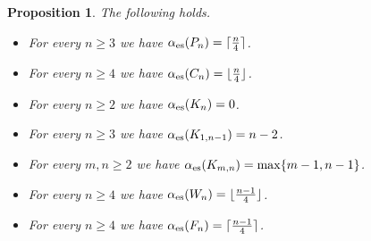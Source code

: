 \documentclass[11pt]{article}
\newtheorem{proposition}[theorem]{Proposition}
\newcommand{\es}{\alpha_{\rm es}}
\begin{document}
\begin{proposition}
\label{families}
The following holds.
\begin{itemize}%
\item[(i)] For every $n\geq 3$ we have $\es(P_n) = \lceil\frac n4\rceil$.
\item[(ii)] For every $n\geq 4$ we have $\es(C_n) = \lfloor\frac n4\rfloor$. 
\item[(iii)] For every $n\geq 2$ we have $\es(K_n) = 0$.
\item[(iv)] For every $n\geq 3$ we have $\es(K_{1,n-1}) = n-2$.
\item[(v)] For every $m,n\geq 2$ we have $\es(K_{m,n}) = \max\{m-1,n-1 \}$.
\item[(vi)] For every $n\geq 4$ we have $\es(W_n) = \lfloor\frac {n-1}{4}\rfloor$.
\item[(vii)] For every $n\geq 4$ we have $\es(F_n) = \lceil\frac {n-1}{4}\rceil$.
\end{itemize}
\end{proposition}
\end{document}
